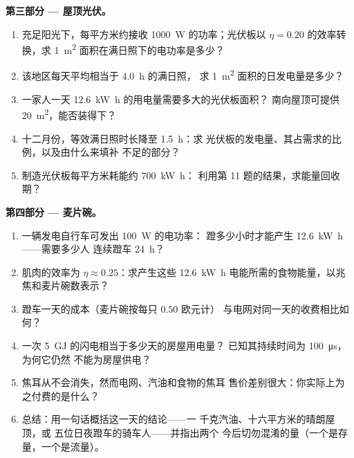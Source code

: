 \begin{problem}
\medskip
\noindent\textbf{第三部分 --- 屋顶光伏。}
\begin{enumerate}[resume]
  \item 充足阳光下，每平方米约接收 \qty{1000}{W}
        的功率；光伏板以 $\eta = 0.20$ 的效率转换，求
        \qty{1}{m^2} 面积在满日照下的电功率是多少？
  \item 该地区每天平均相当于 \qty{4.0}{h} 的满日照，
        求 \qty{1}{m^2} 面积的日发电量是多少？
  \item 一家人一天 \qty{12.6}{kW.h} 的用电量需要多大的光伏板面积？
        南向屋顶可提供 \qty{20}{m^2}，能否装得下？
  \item 十二月份，等效满日照时长降至 \qty{1.5}{h}：求
        光伏板的发电量、其占需求的比例，以及由什么来填补
        不足的部分？
  \item 制造光伏板每平方米耗能约 \qty{700}{kW.h}：
        利用第 11 题的结果，求能量回收期？
\end{enumerate}

\medskip
\noindent\textbf{第四部分 --- 麦片碗。}
\begin{enumerate}[resume]
  \item 一辆发电自行车可发出 \qty{100}{W} 的电功率：
        蹬多少小时才能产生 \qty{12.6}{kW.h}——需要多少人
        连续蹬车 \qty{24}{h}？
  \item 肌肉的效率为 $\eta \approx 0.25$：求产生这些
        \qty{12.6}{kW.h} 电能所需的食物能量，以兆焦和麦片碗数表示？
  \item 蹬车一天的成本（麦片碗按每只 $0.50$ 欧元计）
        与电网对同一天的收费相比如何？
  \item 一次 \qty{5}{GJ} 的闪电相当于多少天的房屋用电量？
        已知其持续时间为 \qty{100}{\micro s}，为何它仍然
        不能为房屋供电？
  \item 焦耳从不会消失，然而电网、汽油和食物的焦耳
        售价差别很大：你实际上为之付费的是什么？
  \item 总结：用一句话概括这一天的结论——一
        千克汽油、十六平方米的晴朗屋顶，或
        五位日夜蹬车的骑车人——并指出两个
        今后切勿混淆的量（一个是存量，一个是流量）。
\end{enumerate}
\end{problem}
